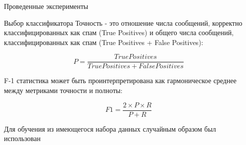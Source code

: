 \begin{section}{Проведенные эксперименты}
\begin{subsection}{Выбор классификатора}
Точность - это отношение числа сообщений, корректно классифицированных как спам (True Positives) и общего числа  сообщений, классифицированных как спам (True Positives + False Positives):

\begin{equation}
  P = \frac{True Positives}{True Positives + False Positives}
\end{equation}

F-1 статистика может быть проинтерпретирована как гармоническое среднее между метриками точности и полноты:

\begin{equation}
  F1 = \frac{2 \times P \times R}{P + R}
\end{equation}



Для обучения из имеющегося набора данных случайным образом был использован







\begin{table}[H]
\centering
{}

\caption{Сравнение показателей классификатора}
\label{tab:results}
\end{table}




\begin{table}[H]
\centering
{}


\end{table}
\end{subsection}
\end{section}
